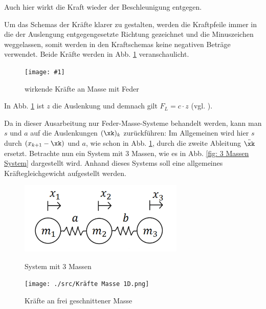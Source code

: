 \documentclass[a4paper,12pt]{report}
\newcommand{\bild}[4]{
      \begin{figure}[!htp]
            \centering
            \texttt{[image: \#1]}
            \caption{#3}
            #4
      \end{figure}
}
\newcommand{\1}{\mathds{1}}
\theoremstyle{plain} %
\theoremstyle{definition} %
\theoremstyle{remark}
\begin{document}
            Auch hier wirkt die Kraft wieder der Beschleunigung entgegen.

            Um das Schemas der Kräfte klarer zu gestalten, werden die Kraftpfeile immer in die der Auslengung entgegengesetzte Richtung gezeichnet und die Minuszeichen weggelassen,
            somit werden in den Kraftschemas keine negativen Beträge verwendet.
            Beide Kräfte werden in Abb. \ref{fig: KräfteAnFeder} veranschaulicht.

            \bild{Federkraft und Trägheitskraft.png}{0.3}{wirkende Kräfte an Masse mit Feder}{\label{fig: KräfteAnFeder}}

            In Abb. \ref{fig: KräfteAnFeder} ist $z$ die Auslenkung und demnach gilt $F_L = c\cdot z$ (vgl. \cite{federkraft}).

            Da in dieser Ausarbeitung nur Feder-Masse-Systeme behandelt werden, kann man $s$ und $a$ auf die Auslenkungen $(\xk)_k$ zurückführen:
            Im Allgemeinen wird hier $s$ durch $(x_{k+1}-\xk)$ und $a$, wie schon in Abb. \ref{fig: KräfteAnFeder}, durch die zweite Ableitung $\ddot \xk$ ersetzt.
            Betrachte nun ein System mit 3 Massen, wie es in Abb. \ref{fig: 3 Massen System} dargestellt wird.
            Anhand dieses Systems soll eine allgemeines Kräftegleichgewicht aufgestellt werden.

            \begin{figure}[ht]
                  \centering
                  \begin{minipage}[ht]{0.49\linewidth}
                        \centering
                        \includegraphics[width=0.7\textwidth, keepaspectratio]{./src/3 Massen System.png}
                        \caption{System mit 3 Massen}
                        \label{fig: 3 Massen System}
                  \end{minipage}
                  \hfill
                  \begin{minipage}[ht]{0.49\linewidth}
                        \centering
                        \texttt{[image: ./src/Kräfte Masse 1D.png]}
                        \caption{Kräfte an frei geschnittener Masse}
                        \label{fig: Kräfte Masse 1D}
                  \end{minipage}
            \end{figure}
\end{document}
